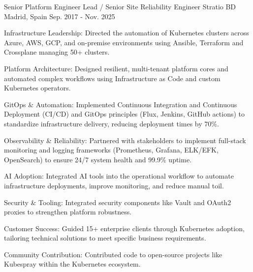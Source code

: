 \begin{cventries}
  \cventry
    {Senior Platform Engineer Lead / Senior Site Reliability Engineer} %
    {Stratio BD} %
    {Madrid, Spain} %
    {Sep. 2017 - Nov. 2025} %
    {
      \begin{cvitems} %
        \item {Infrastructure Leadership: Directed the automation of Kubernetes clusters across Azure, AWS, GCP, and on-premise environments using Ansible, Terraform and Crossplane managing 50+ clusters.}
        \item {Platform Architecture: Designed resilient, multi-tenant platform cores and automated complex workflows using Infrastructure as Code and custom Kubernetes operators.}
        \item {GitOps \& Automation: Implemented Continuous Integration and Continuous Deployment (CI/CD) and GitOps principles (Flux, Jenkins, GitHub actions) to standardize infrastructure delivery, reducing deployment times by 70\%.}
        \item {Observability \& Reliability: Partnered with stakeholders to implement full-stack monitoring and logging frameworks (Prometheus, Grafana, ELK/EFK, OpenSearch) to ensure 24/7 system health and 99.9\% uptime.}
        \item {AI Adoption: Integrated AI tools into the operational workflow to automate infrastructure deployments, improve monitoring, and reduce manual toil.}
        \item {Security \& Tooling: Integrated security components like Vault and OAuth2 proxies to strengthen platform robustness.}
        \item {Customer Success: Guided 15+ enterprise clients through Kubernetes adoption, tailoring technical solutions to meet specific business requirements.}
        \item {Community Contribution: Contributed code to open-source projects like Kubespray within the Kubernetes ecosystem.}
      \end{cvitems}
    }


\end{cventries}
